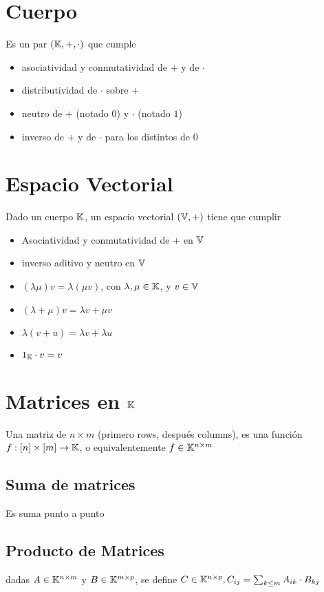 \documentclass{article}
\begin{document}
\section{Cuerpo}
Es un par $(\mathbb{K}, +, \cdot)$ que cumple
\begin{itemize}
	\item asociatividad y conmutatividad de $+$ y de $\cdot$
	\item distributividad de $\cdot$ sobre $+$
	\item neutro de $+$ (notado $0$) y $\cdot$ (notado $1$)
	\item inverso de $+$ y de $\cdot$ para los distintos de $0$
\end{itemize}

\section{Espacio Vectorial}
Dado un cuerpo $\mathbb{K}$, un espacio vectorial $(\mathbb{V}, +)$ tiene que cumplir
\begin{itemize}
	\item Asociatividad y conmutatividad de $+$ en $\mathbb{V}$
	\item inverso aditivo y neutro en $\mathbb{V}$
	\item $(\lambda\mu)v = \lambda(\mu v)$, con $\lambda, \mu \in \mathbb{K}$, y $v \in \mathbb{V}$
	\item $(\lambda + \mu)v = \lambda v + \mu v$
	\item $\lambda(v + u) = \lambda v + \lambda u$
	\item $1_{\mathbb{K}} \cdot v = v$
\end{itemize}

\section{Matrices en $\mathbb{K}$}
Una matriz de $n \times m$ (primero rows, después columns), es una función
$f : [n] \times [m] \to \mathbb{K}$, o equivalentemente $f \in \mathbb{K}^{n \times m}$

\subsection{Suma de matrices}
Es suma punto a punto

\subsection{Producto de Matrices}
dadas $A \in \mathbb{K}^{n \times m}$ y $B \in \mathbb{K}^{m \times p}$, se define
$C \in \mathbb{K}^{n \times p}, C_{ij} = \sum_{k \leq m} A_{ik} \cdot B_{kj}$
\end{document}
